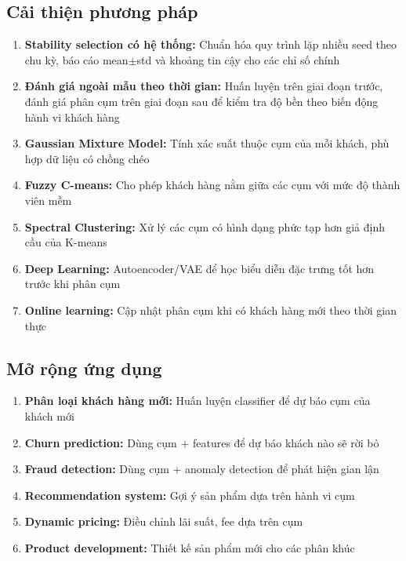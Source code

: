\subsection{Cải thiện phương pháp}

\begin{enumerate}
    \item \textbf{Stability selection có hệ thống:} Chuẩn hóa quy trình lặp nhiều seed theo chu kỳ, báo cáo mean$\pm$std và khoảng tin cậy cho các chỉ số chính
    \item \textbf{Đánh giá ngoài mẫu theo thời gian:} Huấn luyện trên giai đoạn trước, đánh giá phân cụm trên giai đoạn sau để kiểm tra độ bền theo biến động hành vi khách hàng
    \item \textbf{Gaussian Mixture Model:} Tính xác suất thuộc cụm của mỗi khách, phù hợp dữ liệu có chồng chéo
    \item \textbf{Fuzzy C-means:} Cho phép khách hàng nằm giữa các cụm với mức độ thành viên mềm
    \item \textbf{Spectral Clustering:} Xử lý các cụm có hình dạng phức tạp hơn giả định cầu của K-means
    \item \textbf{Deep Learning:} Autoencoder/VAE để học biểu diễn đặc trưng tốt hơn trước khi phân cụm
    \item \textbf{Online learning:} Cập nhật phân cụm khi có khách hàng mới theo thời gian thực
\end{enumerate}

\subsection{Mở rộng ứng dụng}

\begin{enumerate}
    \item \textbf{Phân loại khách hàng mới:} Huấn luyện classifier để dự báo cụm của khách mới
    \item \textbf{Churn prediction:} Dùng cụm + features để dự báo khách nào sẽ rời bỏ
    \item \textbf{Fraud detection:} Dùng cụm + anomaly detection để phát hiện gian lận
    \item \textbf{Recommendation system:} Gợi ý sản phẩm dựa trên hành vi cụm
    \item \textbf{Dynamic pricing:} Điều chỉnh lãi suất, fee dựa trên cụm
    \item \textbf{Product development:} Thiết kế sản phẩm mới cho các phân khúc
\end{enumerate}


